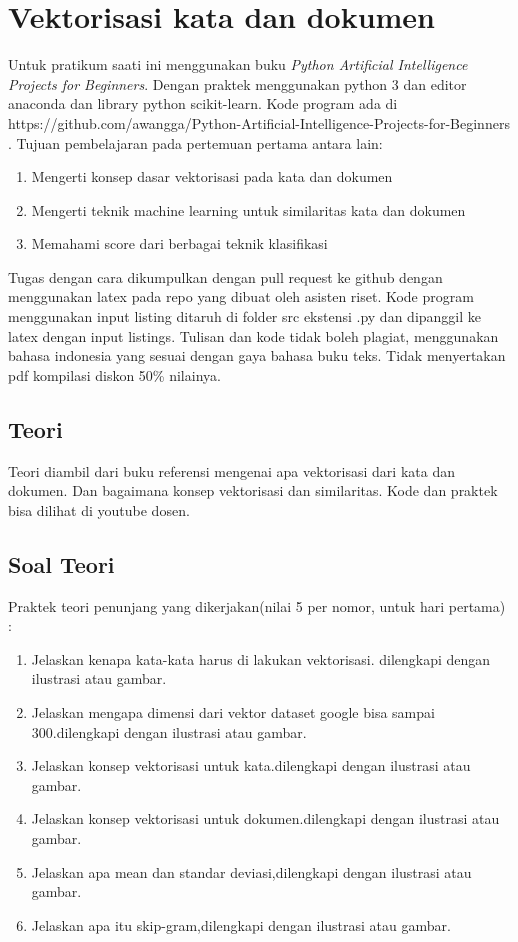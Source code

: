 \chapter{Vektorisasi kata dan dokumen}

Untuk pratikum saati ini menggunakan buku \textit{Python Artificial Intelligence Projects for Beginners}\cite{eckroth2018python}. Dengan praktek menggunakan python 3 dan editor anaconda dan library python scikit-learn.
Kode program ada di https://github.com/awangga/Python-Artificial-Intelligence-Projects-for-Beginners .
Tujuan pembelajaran pada pertemuan pertama antara lain:
\begin{enumerate}
\item
Mengerti konsep dasar vektorisasi pada kata dan dokumen
\item
Mengerti teknik machine learning untuk similaritas kata dan dokumen
\item
Memahami score dari berbagai teknik klasifikasi
\end{enumerate}

Tugas dengan cara dikumpulkan dengan pull request ke github dengan menggunakan latex pada repo yang dibuat oleh asisten riset. Kode program menggunakan input listing ditaruh di folder src ekstensi .py dan dipanggil ke latex dengan input listings. Tulisan dan kode tidak boleh plagiat, menggunakan bahasa indonesia yang sesuai dengan gaya bahasa buku teks. Tidak menyertakan pdf kompilasi diskon 50\% nilainya.

\section{Teori}
Teori diambil dari buku referensi mengenai apa vektorisasi dari kata dan dokumen. Dan bagaimana konsep vektorisasi dan similaritas. Kode dan praktek bisa dilihat di youtube dosen.


\section{Soal Teori}
Praktek teori penunjang yang dikerjakan(nilai 5 per nomor, untuk hari pertama) :
\begin{enumerate}
\item
Jelaskan kenapa kata-kata harus di lakukan vektorisasi. dilengkapi dengan ilustrasi atau gambar.
\item
Jelaskan mengapa dimensi dari vektor dataset google bisa sampai 300.dilengkapi dengan ilustrasi atau gambar.
\item
Jelaskan konsep vektorisasi untuk kata.dilengkapi dengan ilustrasi atau gambar.
\item
Jelaskan konsep vektorisasi untuk dokumen.dilengkapi dengan ilustrasi atau gambar.
\item
Jelaskan apa mean dan standar deviasi,dilengkapi dengan ilustrasi atau gambar.
\item
Jelaskan apa itu skip-gram,dilengkapi dengan ilustrasi atau gambar.
\end{enumerate}



